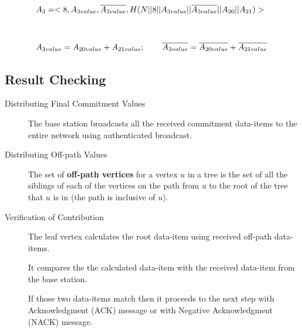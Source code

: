 \documentclass[%
  slidesonly,%
  semlayer%
  ]{seminar}                                  %
\newenvironment{defn}{\noindent \\ \noindent{\bf Defn:}}{\hspace*{\fill} \newline}
\begin{document}
\begin{slide}
      \begin{tiny}
      \begin{equation*}
        \begin{array}{l}
          \\

          A_{3} = <8, A_{3value}, \overline{A_{3value}}, H(N || 8 || A_{3value} || \overline{A_{3value}} || A_{20} ||A_{21}) >\\

          \vspace{0.3in}
          \\

          A_{3value} = A_{20value} + A_{21value}; \hspace{0.3in}  \overline{A_{3value}} = \overline{A_{20value}} + \overline{A_{21value}}
        \end{array}
      \end{equation*}
      \end{tiny}
      \vfill
      \clearpage

    \subsection*{Result Checking}
      \begin{description}

      \item[Distributing Final Commitment Values]
        The base station broadcasts all the received commitment data-items to the entire network using authenticated broadcast.

      \item[Distributing Off-path Values]      
          The set of \textbf{off-path vertices} for a vertex $u$ in a tree is the set of all the siblings of each of the vertices on the path from $u$ to the root of the tree that $u$ is in (the path is inclusive of $u$).

      \item[Verification of Contribution]
        The leaf vertex calculates the root data-item using received off-path data-items.
  
        It compares the the calculated data-item with the received data-item from the base station.
        
        If those two data-items match then it proceeds to the next step with Acknowledgment (ACK) message or with Negative Acknowledgment (NACK) message.


\end{description}
\end{slide}
\end{document}
